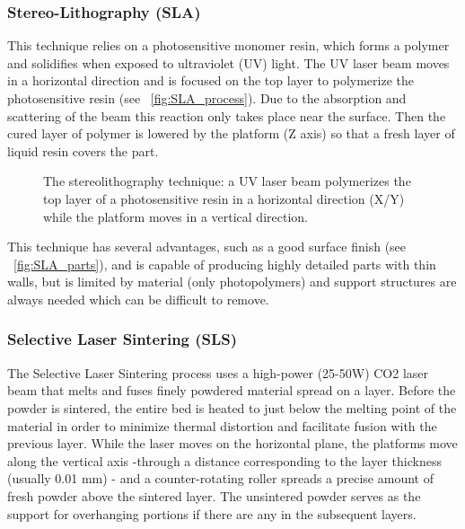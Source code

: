 \subsubsection{Stereo-Lithography (SLA)} %

This technique relies on a photosensitive monomer resin, which forms a polymer and solidifies when exposed to ultraviolet (UV) light. The UV laser beam moves in a horizontal direction and is focused on the top layer to polymerize the photosensitive resin (see \figurename~\ref{fig:SLA_process}). Due to the absorption and scattering of the beam this reaction only takes place near the surface. Then the cured layer of polymer is lowered by the platform (Z axis) so that a fresh layer of liquid resin covers the part.

\begin{figure}[tb]
    \centering
        \hfil
        \hfil
    \caption{The stereolithography technique: a UV laser beam polymerizes the top layer of a photosensitive resin in a horizontal direction (X/Y) while the platform moves in a vertical direction.}
    \label{fig:SLA_technique}
\end{figure}

This technique has several advantages, such as a good surface finish (see \figurename~\ref{fig:SLA_parts}), and is capable of producing highly detailed parts with thin walls, but is limited by material (only photopolymers) and support structures are always needed which can be difficult to remove.

\subsubsection{Selective Laser Sintering (SLS)} %
The Selective Laser Sintering process uses a high-power (25-50W) CO2 laser beam that melts and fuses finely powdered material spread on a layer. Before the powder is sintered, the entire bed is heated to just below the melting point of the material in order to minimize thermal distortion and facilitate fusion with the previous layer.
While the laser moves on the horizontal plane, the platforms move along the vertical axis -through a distance corresponding to the layer thickness (usually 0.01 mm) - and a counter-rotating roller spreads a precise amount of fresh powder above the sintered layer. The unsintered powder serves as the support for overhanging portions if there are any in the subsequent layers.

